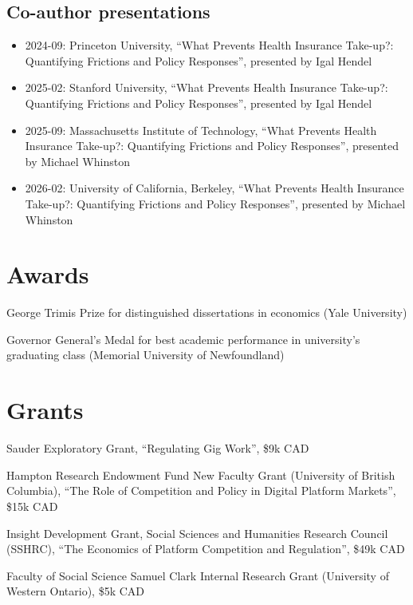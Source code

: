 \documentclass[11pt]{article} %
\begin{document}
\subsection*{Co-author presentations}
\begin{itemize}
	\item 2024-09: Princeton University,
	``What Prevents Health Insurance Take-up?: Quantifying Frictions and Policy Responses'', 
			presented by Igal Hendel
	\item 2025-02: Stanford University,
	``What Prevents Health Insurance Take-up?: Quantifying Frictions and Policy Responses'', 
			presented by Igal Hendel
	\item 2025-09: Massachusetts Institute of Technology,
	``What Prevents Health Insurance Take-up?: Quantifying Frictions and Policy Responses'', 
			presented by Michael Whinston		
	\item 2026-02: University of California, Berkeley,
	``What Prevents Health Insurance Take-up?: Quantifying Frictions and Policy Responses'', 
			presented by Michael Whinston
\end{itemize}

\section*{Awards}

 George Trimis Prize for distinguished dissertations in economics (Yale University)

 Governor General's Medal for best academic performance in university's graduating class
	(Memorial University of Newfoundland)


\section*{Grants}

 Sauder Exploratory Grant, ``Regulating Gig Work'', \$9k CAD

 Hampton Research Endowment Fund New Faculty Grant (University of British Columbia), 
``The Role of Competition and Policy in Digital Platform Markets'', \$15k CAD

 Insight Development Grant, Social Sciences and Humanities Research Council (SSHRC), 
``The Economics of Platform Competition and Regulation'',
\$49k CAD

 Faculty of Social Science Samuel Clark Internal Research Grant (University of Western Ontario), \$5k CAD
\end{document}
